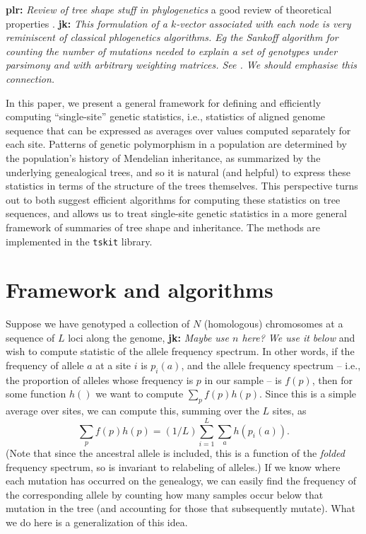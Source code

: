 \documentclass{article}
\newcommand{\tskit}{{\texttt{tskit}}}
\newcommand{\plr}[1]{{\color{blue}\textbf{plr:} \it #1}}
\newcommand{\jk}[1]{{\color{red}\textbf{jk:} \it #1}}
\begin{document}
\plr{Review of tree shape stuff in phylogenetics}
a good review of theoretical properties \citet{semple2003phylogenetics}.
\jk{This formulation of a $k$-vector associated with each node is very
reminiscent of classical phlogenetics algorithms. Eg the Sankoff algorithm
for counting the number of mutations needed to explain a set of genotypes
under parsimony and with arbitrary weighting matrices. See
\citep[pg.13]{felsenstein2004inferring}. We should emphasise this connection.}

In this paper, we present a general framework for defining and efficiently computing
``single-site'' genetic statistics,
i.e., statistics of aligned genome sequence that can be expressed as averages over values computed
separately for each site.
Patterns of genetic polymorphism in a population
are determined by the population's history of Mendelian inheritance,
as summarized by the underlying genealogical trees,
and so it is natural (and helpful) to express these statistics
in terms of the structure of the trees themselves.
This perspective turns out to both suggest efficient algorithms
for computing these statistics on tree sequences,
and allows us to treat single-site genetic statistics in a more general framework
of summaries of tree shape and inheritance.
The methods are implemented in the \tskit{} library.

\section*{Framework and algorithms}


Suppose we have genotyped a collection of $N$ (homologous) chromosomes
at a sequence of $L$ loci along the genome,
\jk{Maybe use $n$ here? We use it below}
and wish to compute statistic of the allele frequency spectrum.
In other words, if the frequency of allele $a$ at a site $i$ is $p_i(a)$,
and the allele frequency spectrum
-- i.e., the proportion of alleles whose frequency is $p$ in our sample -- is $f(p)$,
then for some function $h()$ we want to compute $\sum_p f(p) h(p)$.
Since this is a simple average over sites,
we can compute this, summing over the $L$ sites, as
$$\sum_p f(p) h(p) = (1/L) \sum_{i=1}^L \sum_a h(p_i(a)).$$
(Note that since the ancestral allele is included, this is a function of the 
\emph{folded} frequency spectrum, so is invariant to relabeling of alleles.)
If we know where each mutation has occurred on the genealogy,
we can easily find the frequency of the corresponding allele by counting how many samples
occur below that mutation in the tree (and accounting for those that subsequently mutate).
What we do here is a generalization of this idea.
\end{document}
